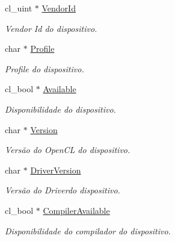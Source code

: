 \begin{DoxyCompactItemize}
cl\+\_\+uint $\ast$ \hyperlink{structdevices_a1daa59b7c3a24931a3d38b8f2e30d2cd}{Vendor\+Id}
\begin{DoxyCompactList}\small\item\em Vendor Id do dispositivo. \end{DoxyCompactList}\item 
\hypertarget{structdevices_aa03bc49fe9aa53252d807b5b29c2fa5b}{}\label{structdevices_aa03bc49fe9aa53252d807b5b29c2fa5b} 
char $\ast$ \hyperlink{structdevices_aa03bc49fe9aa53252d807b5b29c2fa5b}{Profile}
\begin{DoxyCompactList}\small\item\em Profile do dispositivo. \end{DoxyCompactList}\item 
\hypertarget{structdevices_a69f3ac687998d8e0325d11b5ffdb83b3}{}\label{structdevices_a69f3ac687998d8e0325d11b5ffdb83b3} 
cl\+\_\+bool $\ast$ \hyperlink{structdevices_a69f3ac687998d8e0325d11b5ffdb83b3}{Available}
\begin{DoxyCompactList}\small\item\em Disponibilidade do dispositivo. \end{DoxyCompactList}\item 
\hypertarget{structdevices_abc057f42fdaf5e63835a8272aefe278e}{}\label{structdevices_abc057f42fdaf5e63835a8272aefe278e} 
char $\ast$ \hyperlink{structdevices_abc057f42fdaf5e63835a8272aefe278e}{Version}
\begin{DoxyCompactList}\small\item\em Versão do Open\+CL do dispositivo. \end{DoxyCompactList}\item 
\hypertarget{structdevices_a80db1b5836fa2f329777658847144c3a}{}\label{structdevices_a80db1b5836fa2f329777658847144c3a} 
char $\ast$ \hyperlink{structdevices_a80db1b5836fa2f329777658847144c3a}{Driver\+Version}
\begin{DoxyCompactList}\small\item\em Versão do Driverdo dispositivo. \end{DoxyCompactList}\item 
\hypertarget{structdevices_accb48def3c87e3dcde3061ea53ca156f}{}\label{structdevices_accb48def3c87e3dcde3061ea53ca156f} 
cl\+\_\+bool $\ast$ \hyperlink{structdevices_accb48def3c87e3dcde3061ea53ca156f}{Compiler\+Available}
\begin{DoxyCompactList}\small\item\em Disponibilidade do compilador do dispositivo. \end{DoxyCompactList}\item 

\end{DoxyCompactItemize}
